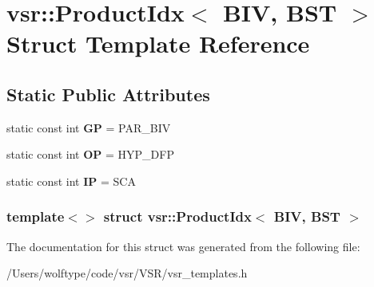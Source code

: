 \hypertarget{structvsr_1_1_product_idx_3_01_b_i_v_00_01_b_s_t_01_4}{\section{vsr\-:\-:Product\-Idx$<$ B\-I\-V, B\-S\-T $>$ Struct Template Reference}
\label{structvsr_1_1_product_idx_3_01_b_i_v_00_01_b_s_t_01_4}
}
\subsection*{Static Public Attributes}
\begin{DoxyCompactItemize}
\item 
\hypertarget{structvsr_1_1_product_idx_3_01_b_i_v_00_01_b_s_t_01_4_a3300368d1eef61ad31fe8d3a4bbd4839}{static const int {\bfseries G\-P} = P\-A\-R\-\_\-\-B\-I\-V}\label{structvsr_1_1_product_idx_3_01_b_i_v_00_01_b_s_t_01_4_a3300368d1eef61ad31fe8d3a4bbd4839}

\item 
\hypertarget{structvsr_1_1_product_idx_3_01_b_i_v_00_01_b_s_t_01_4_ad597a979df80710db4ba666bfe236a04}{static const int {\bfseries O\-P} = H\-Y\-P\-\_\-\-D\-F\-P}\label{structvsr_1_1_product_idx_3_01_b_i_v_00_01_b_s_t_01_4_ad597a979df80710db4ba666bfe236a04}

\item 
\hypertarget{structvsr_1_1_product_idx_3_01_b_i_v_00_01_b_s_t_01_4_a9676a8d3e10a5cd3aa317e7bd4a696e9}{static const int {\bfseries I\-P} = S\-C\-A}\label{structvsr_1_1_product_idx_3_01_b_i_v_00_01_b_s_t_01_4_a9676a8d3e10a5cd3aa317e7bd4a696e9}

\end{DoxyCompactItemize}
\subsubsection*{template$<$$>$ struct vsr\-::\-Product\-Idx$<$ B\-I\-V, B\-S\-T $>$}



The documentation for this struct was generated from the following file\-:\begin{DoxyCompactItemize}
\item 
/\-Users/wolftype/code/vsr/\-V\-S\-R/vsr\-\_\-templates.\-h\end{DoxyCompactItemize}
